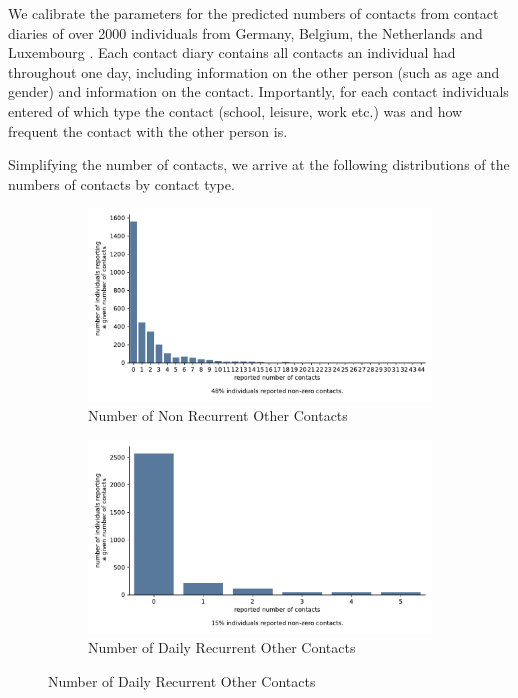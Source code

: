 We calibrate the parameters for the predicted numbers of contacts from contact diaries
of over 2000 individuals from Germany, Belgium, the Netherlands and Luxembourg
\citep{Mossong2008}. Each contact diary contains all contacts an individual had
throughout one day, including information on the other person (such as age and gender)
and information on the contact. Importantly, for each contact individuals entered of
which type the contact (school, leisure, work etc.) was and how frequent the contact
with the other person is.

Simplifying the number of contacts, we arrive at the following distributions of the
numbers of contacts by contact type.

\begin{figure}
    \centering

    \begin{subfigure}[b]{0.25\textwidth}
        \centering

        \includegraphics[width=\textwidth]{figures/results/figures/data/distributions_of_the_number_of_contacts/other_non_recurrent}
        \caption{Number of Non Recurrent Other Contacts}
        \label{n_contacts_other_non_recurrent}
    \end{subfigure}

    \hfill

    \begin{subfigure}[b]{0.25\textwidth}
        \centering
        \includegraphics[width=\textwidth]{figures/results/figures/data/distributions_of_the_number_of_contacts/other_recurrent_daily}
        \caption{Number of Daily Recurrent Other Contacts}
        \label{n_contacts_other_daily_recurrent}
    \end{subfigure}


\end{figure}
